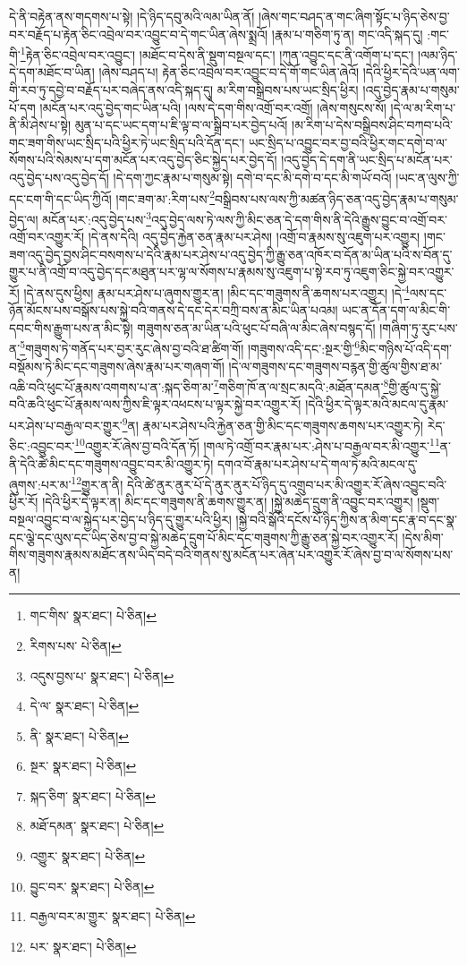 དེ་ནི་བརྟེན་ནས་གདགས་པ་སྟེ། །དེ་ཉིད་དབུ་མའི་ལམ་ཡིན་ནོ། །ཞེས་གང་བཤད་ན་གང་ཞིག་སྟོང་པ་ཉིད་ཅེས་བྱ་བར་བརྗོད་པ་རྟེན་ཅིང་འབྲེལ་བར་འབྱུང་བ་དེ་གང་ཡིན་ཞེས་སྨྲའོ། །རྣམ་པ་གཅིག་ཏུ་ན། གང་འདི་སྐད་དུ། :གང་གི་\footnote{གང་གིས་  སྣར་ཐང་།  པེ་ཅིན། }རྟེན་ཅིང་འབྲེལ་བར་འབྱུང་། །མཐོང་བ་དེས་ནི་སྡུག་བསྔལ་དང་། །ཀུན་འབྱུང་དང་ནི་འགོག་པ་དང་། །ལམ་ཉིད་དེ་དག་མཐོང་བ་ཡིན། །ཞེས་བཤད་པ། རྟེན་ཅིང་འབྲེལ་བར་འབྱུང་བ་དེ་གོ་གང་ཡིན་ཞེའོ། །དེའི་ཕྱིར་དེའི་ཡན་ལག་གི་རབ་ཏུ་དབྱེ་བ་བརྗོད་པར་བཞེད་ནས་འདི་སྐད་དུ། མ་རིག་བསྒྲིབས་པས་ཡང་སྲིད་ཕྱིར། །འདུ་བྱེད་རྣམ་པ་གསུམ་པོ་དག །མངོན་པར་འདུ་བྱེད་གང་ཡིན་པའི། །ལས་དེ་དག་གིས་འགྲོ་བར་འགྲོ། །ཞེས་གསུངས་སོ། །དེ་ལ་མ་རིག་པ་ནི་མི་ཤེས་པ་སྟེ། མུན་པ་དང་ཡང་དག་པ་ཇི་ལྟ་བ་ལ་སྒྲིབ་པར་བྱེད་པའོ། །མ་རིག་པ་དེས་བསྒྲིབས་ཤིང་བཀབ་པའི་གང་ཟག་གིས་ཡང་སྲིད་པའི་ཕྱིར་ཏེ་ཡང་སྲིད་པའི་དོན་དང་། ཡང་སྲིད་པ་འབྱུང་བར་བྱ་བའི་ཕྱིར་གང་དགེ་བ་ལ་སོགས་པའི་སེམས་པ་དག་མངོན་པར་འདུ་བྱེད་ཅིང་སྐྱེད་པར་བྱེད་དོ། །འདུ་བྱེད་དེ་དག་ནི་ཡང་སྲིད་པ་མངོན་པར་འདུ་བྱེད་པས་འདུ་བྱེད་དོ། །དེ་དག་ཀྱང་རྣམ་པ་གསུམ་སྟེ། དགེ་བ་དང་མི་དགེ་བ་དང་མི་གཡོ་བའོ། །ཡང་ན་ལུས་ཀྱི་དང་ངག་གི་དང་ཡིད་ཀྱིའོ། །གང་ཟག་མ་:རིག་པས་\footnote{རིགས་པས་  པེ་ཅིན། }བསྒྲིབས་པས་ལས་ཀྱི་མཚན་ཉིད་ཅན་འདུ་བྱེད་རྣམ་པ་གསུམ་བྱེད་ལ། མངོན་པར་:འདུ་བྱེད་པས་\footnote{འདུས་བྱས་པ་  སྣར་ཐང་།  པེ་ཅིན། }འདུ་བྱེད་ལས་ཏེ་ལས་ཀྱི་མིང་ཅན་དེ་དག་གིས་ནི་དེའི་རྒྱུས་བྱུང་བ་འགྲོ་བར་འགྲོ་བར་འགྱུར་རོ། །དེ་ནས་དེའི། འདུ་བྱེད་རྐྱེན་ཅན་རྣམ་པར་ཤེས། །འགྲོ་བ་རྣམས་སུ་འཇུག་པར་འགྱུར། །གང་ཟག་འདུ་བྱེད་བྱས་ཤིང་བསགས་པ་དེའི་རྣམ་པར་ཤེས་པ་འདུ་བྱེད་ཀྱི་རྒྱུ་ཅན་འཁོར་བ་དོན་མ་ཡིན་པའི་ས་བོན་དུ་གྱུར་པ་ནི་འགྲོ་བ་འདུ་བྱེད་དང་མཐུན་པར་ལྷ་ལ་སོགས་པ་རྣམས་སུ་འཇུག་པ་སྟེ་རབ་ཏུ་འཇུག་ཅིང་སྐྱེ་བར་འགྱུར་རོ། །དེ་ནས་དུས་ཕྱིས། རྣམ་པར་ཤེས་པ་ཞུགས་གྱུར་ན། །མིང་དང་གཟུགས་ནི་ཆགས་པར་འགྱུར། །དེ་\footnote{དེ་ལ་  སྣར་ཐང་།  པེ་ཅིན། }ལས་དང་ཉོན་མོངས་པས་བསྒོས་པས་སྐྱེ་བའི་གནས་དེ་དང་དེར་བཀྲི་བས་ན་མིང་ཡིན་པའམ། ཡང་ན་དོན་དག་ལ་མིང་གི་དབང་གིས་རྒྱུག་པས་ན་མིང་སྟེ། གཟུགས་ཅན་མ་ཡིན་པའི་ཕུང་པོ་བཞི་ལ་མིང་ཞེས་བསྙད་དོ། །གཞིག་ཏུ་རུང་པས་ན་\footnote{ནི་  སྣར་ཐང་།  པེ་ཅིན། }གཟུགས་ཏེ་གནོད་པར་བྱར་རུང་ཞེས་བྱ་བའི་ཐ་ཚིག་གོ། །གཟུགས་འདི་དང་:སྔར་གྱི་\footnote{སྔར་  སྣར་ཐང་།  པེ་ཅིན། }མིང་གཉིས་པོ་འདི་དག་བསྡོམས་ཏེ་མིང་དང་གཟུགས་ཞེས་རྣམ་པར་གཞག་གོ། །དེ་ལ་གཟུགས་དང་གཟུགས་བརྙན་གྱི་ཚུལ་གྱིས་ཐ་མ་འཆི་བའི་ཕུང་པོ་རྣམས་འགགས་པ་ན་:སྐད་ཅིག་མ་\footnote{སྐད་ཅིག་  སྣར་ཐང་།  པེ་ཅིན། }གཅིག་ཁོ་ན་ལ་སྲང་མདའི་:མཐོན་དམན་\footnote{མཐོ་དམན་  སྣར་ཐང་།  པེ་ཅིན། }གྱི་ཚུལ་དུ་སྐྱེ་བའི་ཆའི་ཕུང་པོ་རྣམས་ལས་ཀྱིས་ཇི་ལྟར་འཕངས་པ་ལྟར་སྐྱེ་བར་འགྱུར་རོ། །དེའི་ཕྱིར་དེ་ལྟར་མའི་མངལ་དུ་རྣམ་པར་ཤེས་པ་བརྒྱལ་བར་གྱུར་\footnote{འགྱུར་  སྣར་ཐང་།  པེ་ཅིན། }ན། རྣམ་པར་ཤེས་པའི་རྐྱེན་ཅན་གྱི་མིང་དང་གཟུགས་ཆགས་པར་འགྱུར་ཏེ། རེད་ཅིང་:འབྱུང་བར་\footnote{བྱུང་བར་  སྣར་ཐང་།  པེ་ཅིན། }འགྱུར་རོ་ཞེས་བྱ་བའི་དོན་ཏོ། །གལ་ཏེ་འགྲོ་བར་རྣམ་པར་:ཤེས་པ་བརྒྱལ་བར་མི་འགྱུར་\footnote{བརྒྱལ་བར་མ་གྱུར་  སྣར་ཐང་།  པེ་ཅིན། }ན་ནི་དེའི་ཚེ་མིང་དང་གཟུགས་འབྱུང་བར་མི་འགྱུར་ཏེ། དགའ་བོ་རྣམ་པར་ཤེས་པ་དེ་གལ་ཏེ་མའི་མངལ་དུ་ཞུགས་:པར་མ་\footnote{པར་  སྣར་ཐང་།  པེ་ཅིན། }གྱུར་ན་ནི། དེའི་ཚེ་ནུར་ནུར་པོ་དེ་ནུར་ནུར་པོ་ཉིད་དུ་འགྲུབ་པར་མི་འགྱུར་རོ་ཞེས་འབྱུང་བའི་ཕྱིར་རོ། །དེའི་ཕྱིར་དེ་ལྟར་ན། མིང་དང་གཟུགས་ནི་ཆགས་གྱུར་ན། །སྐྱེ་མཆེད་དྲུག་ནི་འབྱུང་བར་འགྱུར། །སྡུག་བསྔལ་འབྱུང་བ་ལ་སྐྱེད་པར་བྱེད་པ་ཉིད་དུ་གྱུར་པའི་ཕྱིར། །སྐྱེ་བའི་སྒོའི་དངོས་པོ་ཉིད་ཀྱིས་ན་མིག་དང་རྣ་བ་དང་སྣ་དང་ལྕེ་དང་ལུས་དང་ཡིད་ཅེས་བྱ་བ་སྐྱེ་མཆེད་དྲུག་པོ་མིང་དང་གཟུགས་ཀྱི་རྒྱུ་ཅན་སྐྱེ་བར་འགྱུར་རོ། །དེས་མིག་གིས་གཟུགས་རྣམས་མཐོང་ནས་ཡིད་བདེ་བའི་གནས་སུ་མངོན་པར་ཞེན་པར་འགྱུར་རོ་ཞེས་བྱ་བ་ལ་སོགས་པས་ན། 